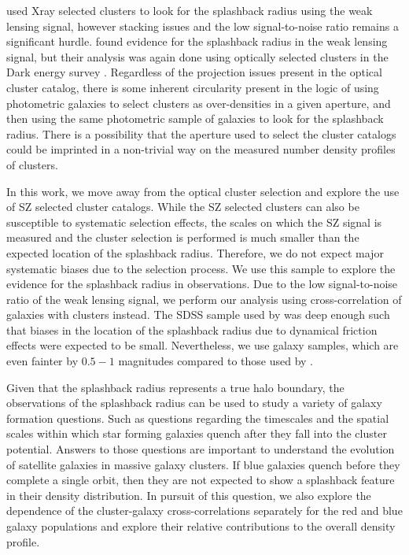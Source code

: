 \documentclass[iop, apjl, twocolappendix, numberedappendix]{emulateapj}
\begin{document}
\citet{umetsu2017lensing} used Xray selected clusters to look for
the splashback radius using the weak lensing signal, however
stacking issues and the low signal-to-noise ratio remains a significant
hurdle. \citet{chang2017splashback} found evidence for the splashback
radius in the weak lensing signal, but their analysis was again done
using optically selected clusters in the Dark energy survey
\citep{dark2005dark}. Regardless of the projection issues present in
the optical cluster catalog, there is some inherent circularity
present in the logic of using photometric galaxies to select
clusters as over-densities in a given aperture, and then using the
same photometric sample of galaxies to look for the splashback
radius. There is a possibility that the aperture used to select the
cluster catalogs could be imprinted in a non-trivial way on the
measured number density profiles of clusters. 

In this work, we move away from the optical cluster selection and
explore the use of SZ selected cluster catalogs. While the SZ
selected clusters can also be susceptible to systematic selection
effects, the scales on which the SZ signal is measured and the
cluster selection is performed is much smaller than the expected
location of the splashback radius. Therefore, we do not expect major
systematic biases due to the selection process. We use this sample
to explore the evidence for the splashback radius in observations.
Due to the low signal-to-noise ratio of the weak lensing signal, we
perform our analysis using cross-correlation of galaxies with
clusters instead. The SDSS sample used by \citet{more2016detection}
was deep enough such that biases in the location of the splashback
radius due to dynamical friction effects were expected to be small.
Nevertheless, we use galaxy samples, which are even fainter by
$0.5-1$ magnitudes compared to those used by
\citet{more2016detection}.

Given that the splashback radius represents a true halo boundary,
the observations of the splashback radius can be used to study a
variety of galaxy formation questions. Such as questions 
regarding the timescales and the spatial scales within
which star forming galaxies quench after they fall into the cluster
potential. Answers to those questions are important to understand 
the evolution of satellite galaxies in massive galaxy clusters. 
If blue galaxies quench before
they complete a single orbit, then they are not expected to show a
splashback feature in their density distribution. In pursuit of this
question, we also explore the dependence of the cluster-galaxy
cross-correlations separately for the red and blue galaxy populations 
and explore their relative contributions to the overall density profile.
\end{document}
